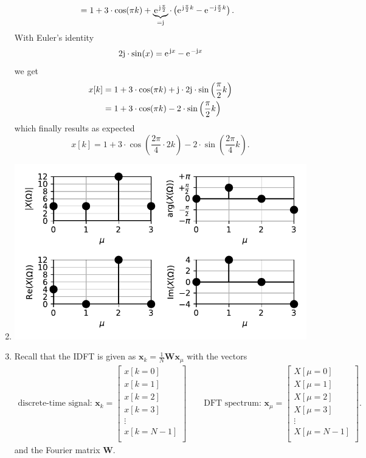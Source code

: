 \documentclass[11pt,a4paper,DIV=12]{scrartcl}
\begin{document}
\begin{Loesung}
\begin{enumerate}[label=\alph*)]
\begin{align}
	&=1+3\cdot\cos(\pi k)+\underbrace{\e^{\im\frac{\pi}{2}}}_{=\im}\cdot\left(\e^{\im\frac{\pi}{2}k}-\e^{-\im\frac{\pi}{2}k}\right).\nonumber
	\end{align}
 With Euler's identity
	\begin{equation}
	2\im\cdot\sin(x)=\e^{\im x}-\e^{-\im x}\nonumber
	\end{equation}
	we get
	\begin{align}
	x[k]&=1+3\cdot\cos(\pi k)+\im\cdot2\im\cdot\sin\left(\frac{\pi}{2}k\right)\nonumber\\
	&=1+3\cdot\cos(\pi k)-2\cdot\sin\left(\frac{\pi}{2}k\right)\nonumber
	\end{align}
	which finally results as expected
	\begin{equation}
	x[k]=1+3\cdot\cos\left(\frac{2\pi}{4}\cdot2k\right)-2\cdot\sin\left(\frac{2\pi}{4}k\right).\nonumber
	\end{equation}
	\item \text{}
	\begin{center}%
		\includegraphics[width=5in, height=3in]{graphics/UE1_Exercise2_IDFT.pdf}%
  \end{center}%
	\item
  Recall that the IDFT is given as $\bm x_k = \frac{1}{N} \bm W \bm x_\mu$ with
  the vectors
  \begin{align}
  \text{discrete-time signal: }
  \bm{x}_k =
  \begin{bmatrix}
  x[k=0]\\
  x[k=1]\\
  x[k=2]\\
  x[k=3]\\
  \vdots\\
  x[k=N-1]\\
  \end{bmatrix}\qquad
  \text{DFT spectrum: }
  \bm{x}_\mu =
  \begin{bmatrix}
  X[\mu=0]\\
  X[\mu=1]\\
  X[\mu=2]\\
  X[\mu=3]\\
  \vdots\\
  X[\mu=N-1]\\
  \end{bmatrix}.
  \end{align}
  and the Fourier matrix $\bm W$.


\end{enumerate}
\end{Loesung}
\end{document}
